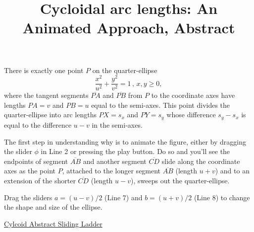 \documentclass{ximera}
\title{Cycloidal arc lengths: An Animated Approach, Abstract}
\begin{document}
\begin{abstract}
\end{abstract}
\maketitle
 
\begin{exploration} \label{SlidingLadders}
There is exactly one point $P$ on the quarter-ellipse
\[
 \frac{x^2}{u^2} + \frac{y^2}{v^2} = 1 \, , \, x,y\geq 0,
\]
where the tangent segments $\overline{PA}$ and $\overline{PB}$ from $P$ to the coordinate axes have lengths $PA=v$ and $PB=u$ equal to the semi-axes. This point divides the quarter-ellipse into arc lengths $PX=s_x$ and $PY=s_y$ whose difference $s_y - s_x$ is equal to the difference  $u-v$ in the semi-axes.


The first step in understanding why is to animate the figure, either by dragging the slider $\phi$ in Line 2 or pressing the play button. Do so and you'll see the endpoints of segment $\overline{AB}$ and another segment $\overline{CD}$ slide along the coordinate axes as the point $P$, attached to the longer segment $\overline{AB}$ (length $u+v$) and to an extension of the shorter $\overline{CD}$ (length $u-v$), sweeps out the quarter-ellipse. 

Drag the sliders $a=(u-v)/2$ (Line 7) and $b=(u+v)/2$ (Line 8) to change the shape and size of the ellipse.


\begin{onlineOnly}
    \begin{center}
\end{center}
\end{onlineOnly}

\href{https://www.desmos.com/calculator/b8xr2fpea3}{Cylcoid Abstract Sliding Ladder}
\end{exploration}
\end{document}
